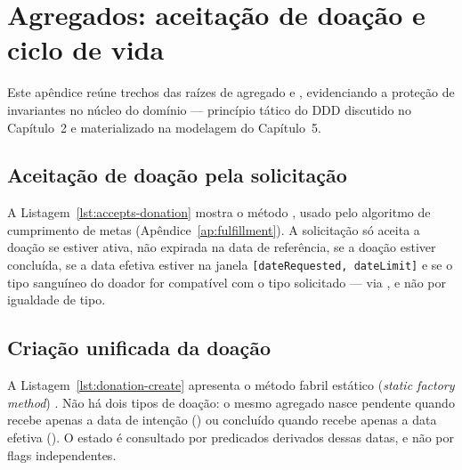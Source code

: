 \chapter{Agregados: aceitação de doação e ciclo de vida}
\label{ap:agregados}

Este apêndice reúne trechos das raízes de agregado  e , evidenciando a proteção de invariantes no núcleo do domínio --- princípio tático do DDD discutido no Capítulo~2 e materializado na modelagem do Capítulo~5.

\section{Aceitação de doação pela solicitação}

A Listagem~\ref{lst:accepts-donation} mostra o método , usado pelo algoritmo de cumprimento de metas (Apêndice~\ref{ap:fulfillment}). A solicitação só aceita a doação se estiver ativa, não expirada na data de referência, se a doação estiver concluída, se a data efetiva estiver na janela \texttt{[dateRequested, dateLimit]} e se o tipo sanguíneo do doador for compatível com o tipo solicitado --- via , e não por igualdade de tipo.



\section{Criação unificada da doação}

A Listagem~\ref{lst:donation-create} apresenta o método fabril estático (\textit{static factory method}) . Não há dois tipos de doação: o mesmo agregado nasce pendente quando recebe apenas a data de intenção () ou concluído quando recebe apenas a data efetiva (). O estado é consultado por predicados derivados dessas datas, e não por flags independentes.



